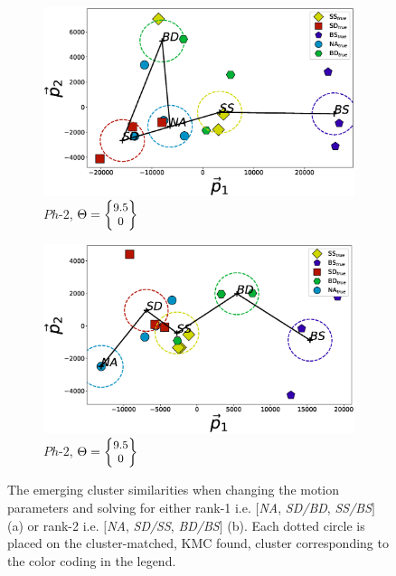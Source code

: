 \begin{figure}[]
	\centering
	\begin{subfigure}[b]{\columnwidth}
		\includegraphics[width=\textwidth]{./figs/phantom2properties_distfig_Vertical-d9_5.eps}
		\caption{$Ph\text{-}2$, $\Theta = \small{\begin{Bmatrix}9.5\\ 0\end{Bmatrix}}$}
		\label{cluster_distance:ph1-1}
	\end{subfigure}
	\begin{subfigure}[b]{\columnwidth}
		\includegraphics[width=\textwidth]{./figs/phantom2properties_distfig_Vertical-d15_5.eps}
		\caption{$Ph\text{-}2$, $\Theta = \small{\begin{Bmatrix}9.5\\ 0\end{Bmatrix}}$}
		\label{cluster_distance:ph1-2}
	\end{subfigure}
	\caption{The emerging cluster similarities when changing the motion parameters and 
		solving for either rank-1 i.e. $[$\textit{NA}, \textit{SD/BD}, 
		\textit{SS/BS}$]$ (a) or rank-2 i.e. $[$\textit{NA}, \textit{SD/SS}, \textit{BD/BS}$]$ (b). 
		Each dotted circle is placed on the cluster-matched, KMC found, cluster corresponding to the color 
		coding in the legend.}
	\label{cluster_distance}
\end{figure}


